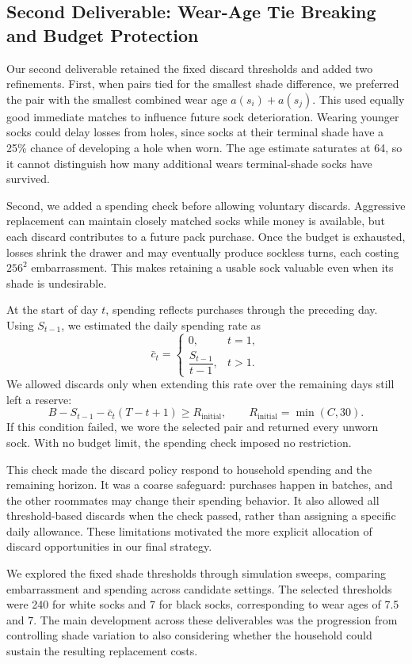 \documentclass[11pt]{article}
\begin{document}
\subsection{Second Deliverable: Wear-Age Tie Breaking and Budget Protection}

Our second deliverable retained the fixed discard thresholds and added two refinements. First, when pairs tied for the smallest shade difference, we preferred the pair with the smallest combined wear age \(a(s_i)+a(s_j)\). This used equally good immediate matches to influence future sock deterioration. Wearing younger socks could delay losses from holes, since socks at their terminal shade have a 25\% chance of developing a hole when worn. The age estimate saturates at 64, so it cannot distinguish how many additional wears terminal-shade socks have survived.

Second, we added a spending check before allowing voluntary discards. Aggressive replacement can maintain closely matched socks while money is available, but each discard contributes to a future pack purchase. Once the budget is exhausted, losses shrink the drawer and may eventually produce sockless turns, each costing \(256^2\) embarrassment. This makes retaining a usable sock valuable even when its shade is undesirable.

At the start of day \(t\), spending reflects purchases through the preceding day. Using \(S_{t-1}\), we estimated the daily spending rate as
\[
\bar c_t=
\begin{cases}
0, & t=1,\\[4pt]
\dfrac{S_{t-1}}{t-1}, & t>1.
\end{cases}
\]
We allowed discards only when extending this rate over the remaining days still left a reserve:
\[
B-S_{t-1}-\bar c_t(T-t+1)\ge R_{\mathrm{initial}},
\qquad
R_{\mathrm{initial}}=\min(C,30).
\]
If this condition failed, we wore the selected pair and returned every unworn sock. With no budget limit, the spending check imposed no restriction.

This check made the discard policy respond to household spending and the remaining horizon. It was a coarse safeguard: purchases happen in batches, and the other roommates may change their spending behavior. It also allowed all threshold-based discards when the check passed, rather than assigning a specific daily allowance. These limitations motivated the more explicit allocation of discard opportunities in our final strategy.

We explored the fixed shade thresholds through simulation sweeps, comparing embarrassment and spending across candidate settings. The selected thresholds were 240 for white socks and 7 for black socks, corresponding to wear ages of 7.5 and 7. The main development across these deliverables was the progression from controlling shade variation to also considering whether the household could sustain the resulting replacement costs.
\end{document}
